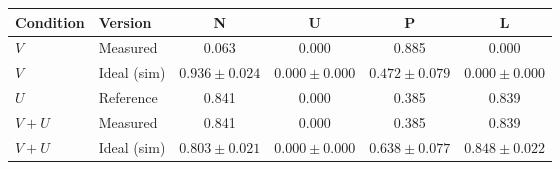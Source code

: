 \begin{tabular}{llcccc}
\toprule
Condition & Version & N & U & P & L \\
\midrule
$V$ & Measured & 0.063 & 0.000 & 0.885 & 0.000 \\
$V$ & Ideal (sim) & $0.936 \pm 0.024$ & $0.000 \pm 0.000$ & $0.472 \pm 0.079$ & $0.000 \pm 0.000$ \\
$U$ & Reference & 0.841 & 0.000 & 0.385 & 0.839 \\
$V{+}U$ & Measured & 0.841 & 0.000 & 0.385 & 0.839 \\
$V{+}U$ & Ideal (sim) & $0.803 \pm 0.021$ & $0.000 \pm 0.000$ & $0.638 \pm 0.077$ & $0.848 \pm 0.022$ \\
\bottomrule
\end{tabular}

